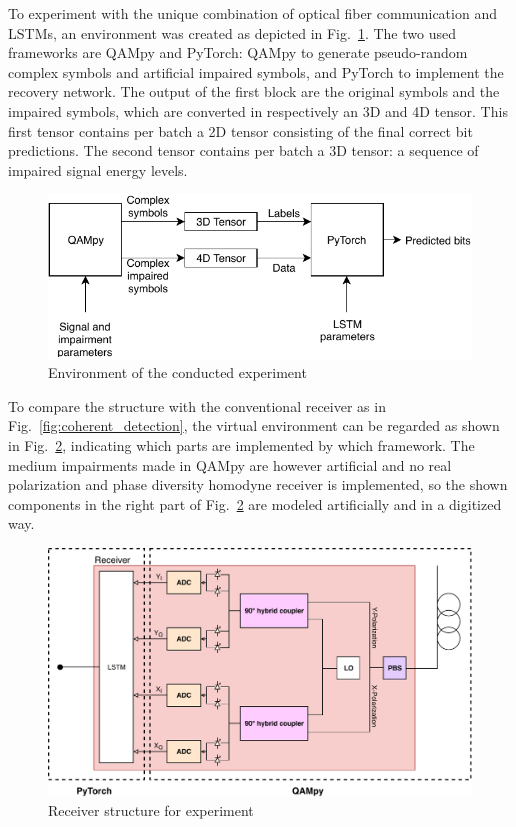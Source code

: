 \documentclass[journal,10pt,twoside, a4paper]{IEEEtran}
\begin{document}
To experiment with the unique combination of optical fiber communication and LSTMs, an environment was created as depicted in Fig.~\ref{fig:combi}. The two used frameworks are QAMpy and PyTorch: QAMpy to generate pseudo-random complex symbols and artificial impaired symbols, and PyTorch to implement the recovery network. The output of the first block are the original symbols and the impaired symbols, which are converted in respectively an 3D and 4D tensor. This first tensor contains per batch a 2D tensor consisting of the final correct bit predictions. The second tensor contains per batch a 3D tensor: a sequence of impaired signal energy levels.

\begin{figure}
    \centering
    \includegraphics[width=\linewidth]{Thesis/images/framework_combi.pdf}
    \caption{Environment of the conducted experiment}
    \label{fig:combi}
\end{figure}

To compare the structure with the conventional receiver as in Fig.~\ref{fig:coherent_detection}, the virtual environment can be regarded as shown in Fig.~\ref{fig:frameworks}, indicating which parts are implemented by which framework. The medium impairments made in QAMpy are however artificial and no real polarization and phase diversity homodyne receiver is implemented, so the shown components in the right part of Fig.~\ref{fig:frameworks} are modeled artificially and in a digitized way.

\begin{figure}
    \centering
    \includegraphics[width=\linewidth]{Thesis/images/PyTorch_QAMpy.pdf}
    \caption{Receiver structure for experiment}
    \label{fig:frameworks}
\end{figure}
\end{document}
